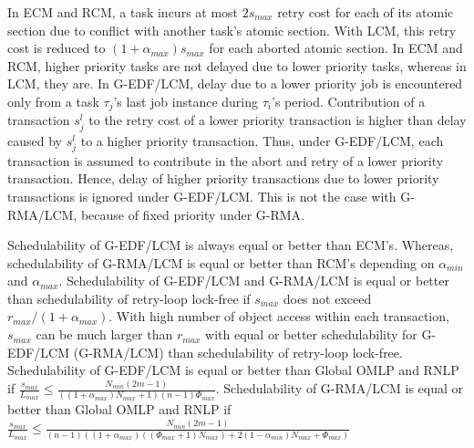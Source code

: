 In ECM and RCM, a task incurs at most $2s_{max}$ retry cost for each of its atomic section due to conflict with another task's atomic section. With LCM, this retry cost is reduced to $(1+\alpha_{max})s_{max}$ for each aborted atomic section. In ECM and RCM, higher priority tasks are not delayed due to lower priority tasks, whereas in LCM, they are. In G-EDF/LCM, delay due to a lower priority job is encountered only from a task $\tau_{j}$'s last job instance 
during $\tau_{i}$'s period. Contribution of a transaction $s_j^l$ to the retry cost of a lower priority transaction is higher than delay caused by $s_j^l$ to a higher priority transaction. Thus, under G-EDF/LCM, each transaction is assumed to contribute in the abort and retry of a lower priority transaction. Hence, delay of higher priority transactions due to lower priority transactions is ignored under G-EDF/LCM. This is not the case with G-RMA/LCM, because of fixed priority under G-RMA.

Schedulability of G-EDF/LCM is always equal or better than ECM's. Whereas, schedulability of G-RMA/LCM is equal or better than RCM's depending on $\alpha_{min}$ and $\alpha_{max}$. Schedulability of G-EDF/LCM and G-RMA/LCM is equal or better than schedulability of retry-loop lock-free if $s_{max}$ does not exceed $r_{max}/\left(1+\alpha_{max}\right)$. With high number of object access within each transaction, $s_{max}$ can be much larger than $r_{max}$ with equal or better schedulability for G-EDF/LCM (G-RMA/LCM) than schedulability of retry-loop lock-free. Schedulability of G-EDF/LCM is equal or better than Global OMLP and RNLP if $
\frac{s_{max}}{L_{max}} \le \frac{N_{min}\left(2m-1\right)}{\left(\left(1+\alpha_{max}\right)N_{max}+1\right)(n-1)\Phi_{max}}$. Schedulability of G-RMA/LCM is equal or better than Global OMLP and RNLP if $
\frac{s_{max}}{L_{max}}\le\frac{N_{min}\left(2m-1\right)}{\left(n-1\right)\left(\left(1+\alpha_{max}\right)\left(\left(\Phi_{max}+1\right)N_{max}\right)+2\left(1-\alpha_{min}\right)N_{max}+\Phi_{max}\right)}
$